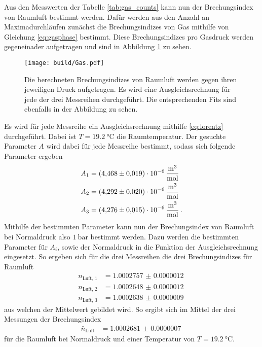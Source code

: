 \FloatBarrier
Aus den Messwerten der Tabelle \ref{tab:gas_counts} kann nun der Brechungsindex von Raumluft bestimmt werden.
Dafür werden aus den Anzahl an Maximadurchläufen zunächst die Brechungsindizes von Gas mithilfe von Gleichung \eqref{eq:gasphase} bestimmt.
Diese Brechungsindizes pro Gasdruck werden gegeneinader aufgetragen und sind in Abbildung \ref{fig:n_glass} zu sehen.
\begin{figure}
    \centering 
    \texttt{[image: build/Gas.pdf]}
    \caption{Die berechneten Brechungsindizes von Raumluft werden gegen ihren jeweiligen Druck aufgetragen.
    Es wird eine Ausgleichsrechnung für jede der drei Messreihen durchgeführt.
    Die entsprechenden Fits sind ebenfalls in der Abbildung zu sehen.}
    \label{fig:n_glass}
\end{figure}
Es wird für jede Messreihe ein Ausgleichsrechnung mithilfe \autoref{eq:lorentz} durchgeführt.
Dabei ist $T=\SI{19.2}{\celsius}$ die Raumtemperatur.
Der gesuchte Parameter $A$ wird dabei für jede Messreihe bestimmt, sodass sich folgende Parameter ergeben
\begin{align*}
    A_1 &= \SI{4.468(19)e-6}{\frac{\cubic\meter}{\mol}} \\
    A_2 &= \SI{4.292(20)e-6}{\frac{\cubic\meter}{\mol}} \\
    A_3 &= \SI{4.276(15)e-6}{\frac{\cubic\meter}{\mol}} \, .
\end{align*}
Mithilfe der bestimmten Parameter kann nun der Brechungsindex von Raumluft bei Normaldruck also $\SI{1}{\bar}$ bestimmt werden.
Dazu werden die bestimmten Parameter für $A_i$, sowie der Normaldruck in die Funktion der Ausgleichsrechnung eingesetzt.
So ergeben sich für die drei Messreihen die drei Brechungsindizes für Raumluft
\begin{align*}
    n_\text{Luft, 1} &= \SI{1.0002757(12)}{}\\
    n_\text{Luft, 2} &= \SI{1.0002648(12)}{}\\
    n_\text{Luft, 3} &= \SI{1.0002638(09)}{}
\end{align*}
aus welchen der Mittelwert gebildet wird.
So ergibt sich im Mittel der drei Messungen der Brechungsindex
\begin{align*}
    \bar{n}_\text{Luft} &= \SI{1.0002681(07)}{}
\end{align*}
für die Raumluft bei Normaldruck und einer Temperatur von $T=\SI{19.2}{\celsius}$.
